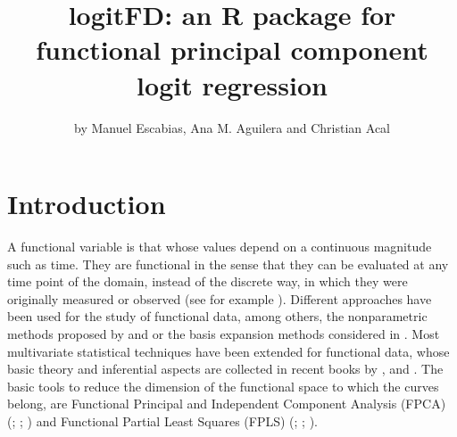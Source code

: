 \title{logitFD: an R package for functional principal component logit regression}
\author{by Manuel Escabias, Ana M. Aguilera and Christian Acal}

\maketitle


\section{Introduction}

A functional variable is that whose values depend on a continuous magnitude such as time. They are functional in the sense that they can be evaluated at any time point of the domain, instead of the discrete way, in which they were originally measured or observed (see for example \cite{Ramsay05}). Different approaches have been used for the study of functional data, among others, the nonparametric methods proposed by \cite{Muller05} and \cite{FerratyVieu} or the basis expansion methods considered in \cite{Ramsay05}. Most multivariate statistical techniques have been extended for functional data, whose basic theory and inferential aspects are collected in recent books by \cite{Horvath}, \cite{Zhang2014} and \cite{Kokoszka2018}. The basic tools to reduce the dimension of the functional space to which the curves belong, are Functional Principal and Independent Component Analysis (FPCA) (\cite{Ramsay05}; \cite{Acal20}; \cite{Vidal2021}) and Functional Partial Least Squares (FPLS) (\cite{Preda2005}; \cite{Aguilera2010}; \cite{Aguilera2016}).


